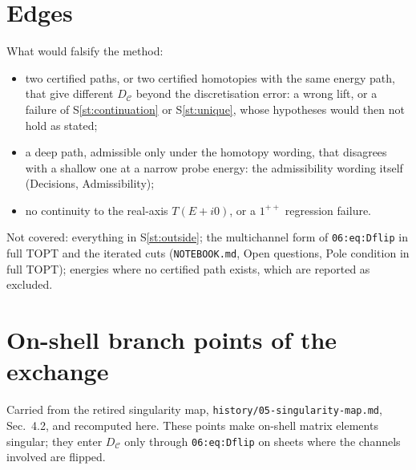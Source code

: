 \documentclass[11pt]{article}
\newcommand{\file}[1]{\nolinkurl{#1}}
\newcommand{\Sr}[1]{S\ref{#1}}
\begin{document}
\section{Edges}\label{sec:edges}

What would falsify the method:
\begin{itemize}
\item two certified paths, or two certified homotopies with the same energy path, that give different $D_{\mathcal C}$ beyond the discretisation error: a wrong lift, or a failure of \Sr{st:continuation} or \Sr{st:unique}, whose hypotheses would then not hold as stated;
\item a deep path, admissible only under the homotopy wording, that disagrees with a shallow one at a narrow probe energy: the admissibility wording itself (Decisions, Admissibility);
\item no continuity to the real-axis $T(E+i0)$, or a $1^{++}$ regression failure.
\end{itemize}
Not covered: everything in \Sr{st:outside}; the multichannel form of \texttt{06:eq:Dflip} in full TOPT and the iterated cuts (\file{NOTEBOOK.md}, Open questions, Pole condition in full TOPT); energies where no certified path exists, which are reported as excluded.

\appendix
\section{On-shell branch points of the exchange}\label{app:onshell}

Carried from the retired singularity map, \file{history/05-singularity-map.md}, Sec.~4.2, and recomputed here. These points make on-shell matrix elements singular; they enter $D_{\mathcal C}$ only through \texttt{06:eq:Dflip} on sheets where the channels involved are flipped.
\end{document}
